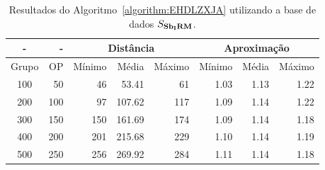 \begin{table}[!htb]
  \caption{Resultados do Algoritmo~\ref{algorithm:EHDLZXJA} utilizando a base de dados $S_{\textbf{Sb\textsubscript{I}RM}}{}$.}
  \label{table:CDIOXZDV}
  \centering
  \begin{tabular}{|c|r|r|r|r|r|r|r|}
    \hline
      -      &  -   & \multicolumn{3}{c|}{Distância}             & \multicolumn{3}{c|}{Aproximação}           \\ \hline
    Grupo    & OP   & Mínimo       & Média        & Máximo       & Mínimo       & Média        & Máximo       \\ \hline  
    100      & 50   & 46           & 53.41        & 61           & 1.03         & 1.13         & 1.22         \\ \hline
    200      & 100  & 97           & 107.62       & 117          & 1.09         & 1.14         & 1.22         \\ \hline
    300      & 150  & 150          & 161.69       & 174          & 1.09         & 1.14         & 1.18         \\ \hline
    400      & 200  & 201          & 215.68       & 229          & 1.10         & 1.14         & 1.19         \\ \hline
    500      & 250  & 256          & 269.92       & 284          & 1.11         & 1.14         & 1.18         \\ \hline    
  \end{tabular}
\end{table}